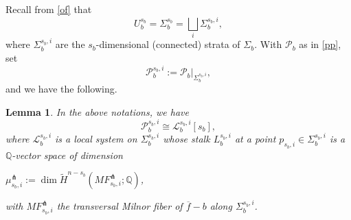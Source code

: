 \documentclass[12pt,leqno,twoside]{amsart}
\newtheorem{lemma}[theorem]{Lemma}
\theoremstyle{remark}
\theoremstyle{remark}
\theoremstyle{definition}
\theoremstyle{remark}
\theoremstyle{remark}
\theoremstyle{remark}
\numberwithin{equation}{section}  %
\newcommand{\Q}{\mathbb{Q}}
\newcommand{\cP}{\mathcal{P}}
\newcommand{\bQ}{\mathbb{Q}}
\newcommand{\of}{\overline{f}}
\begin{document}
Recall from \eqref{of} that $$U_b^{s_b}=\Sigma_b^{s_b}=\bigsqcup_i \Sigma_b^{s_b,i},$$
where $\Sigma_b^{s_b,i}$ are the $s_b$-dimensional (connected) strata of $\Sigma_b$. With $\cP_b$ as in \eqref{pp}, set
\begin{equation}\label{pp11}
\cP_b^{s_b,i}:=\cP_b\vert_{\Sigma_b^{s_b,i}},
\end{equation}
and we have the following.
\begin{lemma}\label{identif3}
In the above notations, we have
\begin{equation}\label{pp12}
\cP_b^{s_b,i} \cong \mathcal{L}_b^{s_b,i}[s_b],
\end{equation}
where $\mathcal{L}_b^{s_b,i}$ is a local system on $\Sigma_b^{s_b,i}$ whose stalk ${L}_b^{s_b,i}$ at a point $p_{s_b,i} \in \Sigma_b^{s_b,i}$ is a $\Q$-vector space of dimension \begin{center} $\mu^\pitchfork_{s_b,i}:= \dim \widetilde{H}^{n-s_b}(MF^\pitchfork_{s_b,i};\bQ)$,\end{center}
with $MF^\pitchfork_{s_b,i}$ the transversal Milnor fiber of $\of-b$ along $\Sigma_b^{s_b,i}$.
\end{lemma}
\end{document}

